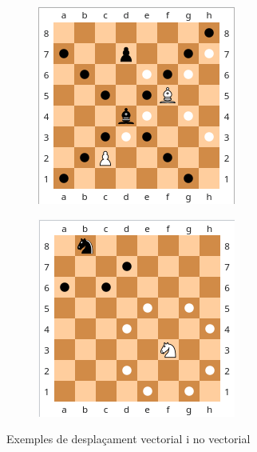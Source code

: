 \begin{figure}[H]
     \centering
     \begin{subfigure}[b]{0.3\textwidth}
         \centering
         \includegraphics[width=\textwidth]{images/alfil.png}
         \label{fig:Alfil}
     \end{subfigure}
     \hspace{0.25\textwidth}
     \begin{subfigure}[b]{0.3\textwidth}
         \centering
         \includegraphics[width=\textwidth]{images/cavall.png}
         \label{fig:Rei}
     \end{subfigure}
        \caption{Exemples de desplaçament vectorial i no vectorial}
        \label{fig:Desplaçament vectorial i no vectorial}
\end{figure}
